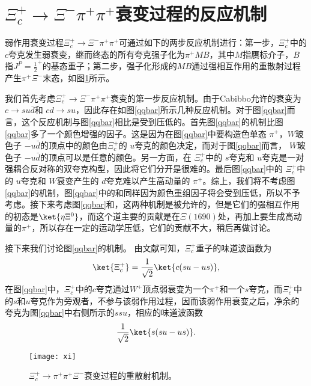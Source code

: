 \section{$\Xi_{c}^{+}\to\Xi^{-}\pi^{+}\pi^{+}$衰变过程的反应机制}
弱作用衰变过程$\Xi_{c}^{+}\to\Xi^{-}\pi^{+}\pi^{+}$可通过如下的两步反应机制进行\cite{PhysRevC.95.035212}：第一步，$\Xi_{c}^{+}$中的$c$夸克发生弱衰变，继而终态的所有夸克强子化为$\pi^{+}MB$，其中$M$指赝标介子，$B$指$J^{P}=\frac{1}{2}^{+}$的基态重子；第二步，强子化形成的$MB$通过强相互作用的重散射过程产生$\pi^{+}\Xi^{-}$末态，如图\ref{xi}所示。\par
我们首先考虑$\Xi_{c}^{+}\to\Xi^{-}\pi^{+}\pi^{+}$衰变的第一步反应机制。由于Cabibbo允许的衰变为 $c\to su\bar{d}$和 $cd\to su$，因此存在如图\ref{qqbar}所示几种反应机制。对于图\ref{qqbar}而言，这个反应机制与图\ref{qqbar}相比是受到压低的。首先图\ref{qqbar}的机制比图\ref{qqbar}多了一个颜色增强的因子。这是因为在图\ref{qqbar}中要构造色单态 $\pi^{+}$，$W$玻色子 $-u\bar{d}$的顶点中的颜色由$\Xi_{c}^{+}$的 $u$夸克的颜色决定，而对于图\ref{qqbar}而言， $W$玻色子 $-u\bar{d}$的顶点可以是任意的颜色。另一方面，在 $\Xi_{c}^{+}$中的 $s$夸克和 $u$夸克是一对强耦合反对称的双夸克构型，因此将它们分开是很难的。最后图\ref{qqbar}中的 $\Xi_{c}^{+}$中的 $u$夸克和 $W$衰变产生的 $d$夸克难以产生高动量的 $\pi^{+}$。综上，我们将不考虑图\ref{qqbar}的机制，图\ref{qqbar}中的和同样因为颜色重组因子将会受到压低，所以不予考虑。接下来考虑图\ref{qqbar}和，这两种机制是被允许的，但是它们的强相互作用的初态是$\ket{\eta\Xi^{0}}$，而这个道主要的贡献是在$\Xi(1690)$处，再加上要生成高动量的$\pi^{+}$，所以存在一定的运动学压低，它们的贡献不大，稍后再做讨论。\par
接下来我们讨论图\ref{qqbar}的机制。
由文献\cite{ROBERTS_2008}可知，$\Xi_{c}^{+}$重子的味道波函数为
\begin{equation}
	\ket{\Xi_{c}^{+}}=\frac{1}{\sqrt{2}}\ket{c(su-us)},
\end{equation}
在图\ref{qqbar}中，$\Xi_{c}^{+}$中的$c$夸克通过$W^{+}$顶点弱衰变为一个$\pi^{+}$和一个$s$夸克，而$\Xi_{c}^{+}$中的$s$和$u$夸克作为旁观者，不参与该弱作用过程，因而该弱作用衰变之后，净余的夸克为图\ref{qqbar}中右侧所示的$ssu$，相应的味道波函数
\begin{equation}
	\label{eqfw}
	\frac{1}{\sqrt{2}}\ket{s(su-us)}.
\end{equation}
\begin{figure}[t]
	\centering
	\texttt{[image: xi]}
	\caption[$\Xi_{c}^{+}\to\pi^{+}\pi^{+}\Xi^{-}$衰变过程的重散射机制]{$\Xi_{c}^{+}\to\pi^{+}\pi^{+}\Xi^{-}$衰变过程的重散射机制。}
	\label{xi}
\end{figure}
